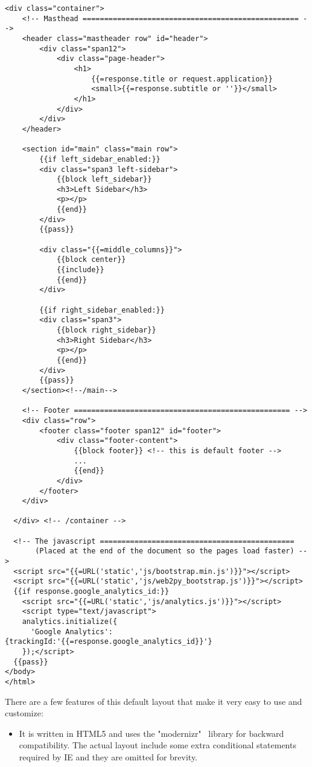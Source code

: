 \documentclass[justified,sixbynine,notoc]{tufte-book}
\begin{document}
\begin{fullwidth}
\begin{lstlisting}[keywords={}]
  <div class="container">
    <!-- Masthead ================================================== -->
    <header class="mastheader row" id="header">
        <div class="span12">
            <div class="page-header">
                <h1>
                    {{=response.title or request.application}}
                    <small>{{=response.subtitle or ''}}</small>
                </h1>
            </div>
        </div>
    </header>

    <section id="main" class="main row">
        {{if left_sidebar_enabled:}}
        <div class="span3 left-sidebar">
            {{block left_sidebar}}
            <h3>Left Sidebar</h3>
            <p></p>
            {{end}}
        </div>
        {{pass}}

        <div class="{{=middle_columns}}">
            {{block center}}
            {{include}}
            {{end}}
        </div>

        {{if right_sidebar_enabled:}}
        <div class="span3">
            {{block right_sidebar}}
            <h3>Right Sidebar</h3>
            <p></p>
            {{end}}
        </div>
        {{pass}}
    </section><!--/main-->

    <!-- Footer ================================================== -->
    <div class="row">
        <footer class="footer span12" id="footer">
            <div class="footer-content">
                {{block footer}} <!-- this is default footer -->
                ...
                {{end}}
            </div>
        </footer>
    </div>

  </div> <!-- /container -->

  <!-- The javascript =============================================
       (Placed at the end of the document so the pages load faster) -->
  <script src="{{=URL('static','js/bootstrap.min.js')}}"></script>
  <script src="{{=URL('static','js/web2py_bootstrap.js')}}"></script>
  {{if response.google_analytics_id:}}
    <script src="{{=URL('static','js/analytics.js')}}"></script>
    <script type="text/javascript">
    analytics.initialize({
      'Google Analytics':{trackingId:'{{=response.google_analytics_id}}'}
    });</script>
  {{pass}}
</body>
</html>
\end{lstlisting}

There are a few features of this default layout that make it very easy to use and customize:

\begin{itemize}
\item It is written in HTML5 and uses the "modernizr"~\cite{modernizr} library for backward compatibility. The actual layout include some extra conditional statements required by IE and they are omitted for brevity.


\end{itemize}
\end{fullwidth}
\end{document}
